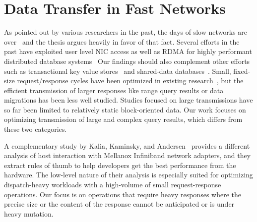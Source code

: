 \section{Data Transfer in Fast Networks}
As pointed out by various researchers in the past, the days of slow networks are over~\cite{slow}
and the thesis argues heavily in favor of that fact. Several efforts in the past have exploited
user level NIC access as well as RDMA for highly performant distributed database systems~\cite{ramcloud,farm,farmtx,drtm,hyper}
Our findings should also complement other efforts such as transactional key value stores~\cite{deuteronomy} 
and shared-data databases~\cite{tell}. Small, fixed-size request/response cycles have been optimized in
existing research~\cite{farm,herd,mica,rdma,ramcloud}, but the efficient
transmission of larger responses like range query results or data
migrations has been less well studied. Studies focused on large transmissions
have so far been limited to relatively static block-oriented data.
Our work focuses on optimizing transmission of large and complex query
results, which differs from these two categories.

A complementary study by Kalia, Kaminsky, and Andersen~\cite{rdma} provides a
different analysis of host interaction with Mellanox Infiniband network adapters,
and they extract rules of thumb to help developers get the best performance from the hardware.
The low-level nature of their analysis is especially suited for
optimizing dispatch-heavy workloads with a high-volume of small
request-response operations. Our focus is on operations that require heavy
responses where the precise size or the content of the response cannot be anticipated or is
under heavy mutation.